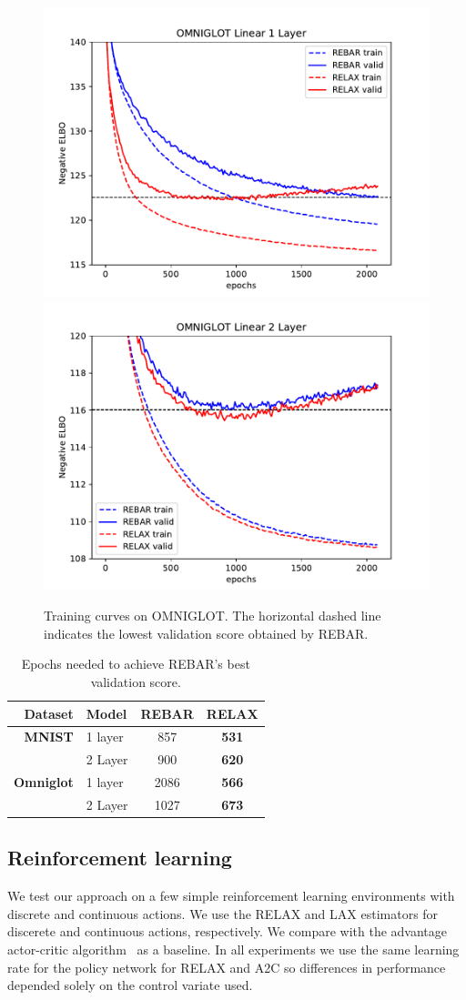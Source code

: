 \documentclass{article}
\newcommand{\LAX}{{\textnormal{LAX}}}
\newcommand{\RELAX}{{\textnormal{RELAX}}}
\begin{document}
\begin{figure}[h]
\centering
\includegraphics[width=.4\textwidth]{figures/OMNIGLOT_L1}
\includegraphics[width=.4\textwidth]{figures/OMNIGLOT_L2}
\caption{Training curves on OMNIGLOT. The horizontal dashed line indicates the lowest validation score obtained by REBAR.}
\label{fig:vae omni}
\end{figure}

\begin{table}[h]
\centering
\begin{tabular}{r l | c c} 
 Dataset & Model  & REBAR & RELAX \\\midrule
\textbf{MNIST} & 1 layer  & 857 & \textbf{531} \\ 
& 2 Layer  & 900 & \textbf{620} \\
\midrule
\textbf{Omniglot} & 1 layer & 2086 & \textbf{566} \\ 
& 2 Layer & 1027 & \textbf{673}
\end{tabular}
\caption{Epochs needed to achieve REBAR's best validation score.}
\label{tab:vae epochs}
\end{table}



\subsection{Reinforcement learning}
We test our approach on a few simple reinforcement learning environments with discrete and continuous actions.
We use the \RELAX{} and \LAX{} estimators for discerete and continuous actions, respectively.
We compare with the advantage actor-critic algorithm~\cite{sutton2000policy} as a baseline.
In all experiments we use the same learning rate for the policy network for RELAX and A2C so differences in performance depended solely on the control variate used. 
\end{document}
